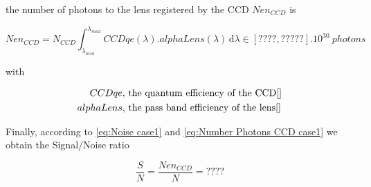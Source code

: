 the number of photons to the lens  registered by the CCD $Nen_{CCD}$ is

\begin{equation}
\label{eq:Number Photons CCD case1}
Nen_{CCD}= N_{CCD}\int_{\lambda_{min}}^{\lambda_{max}}CCDqe(\lambda).alphaLens(\lambda) \, \mathrm d\lambda \in [????, ?????].10^{30} \ photons
\end{equation}

with

\begin{align*}
CCDqe & \mbox{, the quantum efficiency of the CCD\ref{}}\\
alphaLens & \mbox{, the pass band efficiency of the lens\ref{}}
\end{align*}

Finally, according to \eqref{eq:Noise case1} and \eqref{eq:Number Photons CCD case1} we obtain the Signal/Noise ratio 

\begin{equation}
\label{eq:Signal Noise Ratio case1}
\frac{S}{N} = \frac{Nen_{CCD}}{N} = ????
\end{equation}



